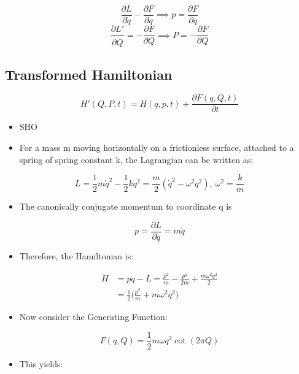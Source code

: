 \documentclass[a4paper,11pt,normalem]{article}
\begin{document}
\[
    \frac{\partial L}{\partial \dot{q}} - \frac{\partial F}{\partial q} \implies p = \frac{\partial F}{\partial q} \]
\[
    \frac{\partial L'}{\partial \dot{Q}} = -\frac{\partial F}{\partial Q} \implies P = -\frac{\partial F}{\partial Q}
\]

\subsection{Transformed Hamiltonian}\label{tranformed-hamiltonian}

\[
    H'(Q, P, t) = H(q, p, t) + \frac{\partial F(q, Q, t)}{\partial t}
\]

\begin{example}
\begin{itemize}
\item
  SHO
\item
  For a mass m moving horizontally on a frictionless surface, attached
  to a spring of spring constant k, the Lagrangian can be written as:
\end{itemize}

\[
    L = \frac{1}{2}m\dot{q}^2 - \frac{1}{2}kq^2 = \frac{m}{2}(\dot{q}^2 - \omega^2 q^2),~ \omega^2 = \frac{k}{m}
\]

\begin{itemize}
\item
  The canonically conjugate momentum to coordinate q is
\end{itemize}

\[
    p = \frac{\partial L}{\partial \dot{q}} = m\dot{q}
\]

\begin{itemize}
\item
  Therefore, the Hamiltonian is:
\end{itemize}

\[
    \begin{aligned}
    H &= p\dot{q} - L = \frac{p^2}{m} - \frac{p^2}{2m} + \frac{m\omega^2 q^2}{2} \\
    &= \frac{1}{2}\Big(\frac{p^2}{m} + m\omega^2 q^2\Big)
    \end{aligned}
\]

\begin{itemize}
\item
  Now consider the Generating Function:
\end{itemize}

\[
    F(q, Q) = \frac{1}{2}m\omega q^2 \cot(2\pi Q)
\]

\begin{itemize}
\item
  This yields:
\end{itemize}


\end{example}
\end{document}

